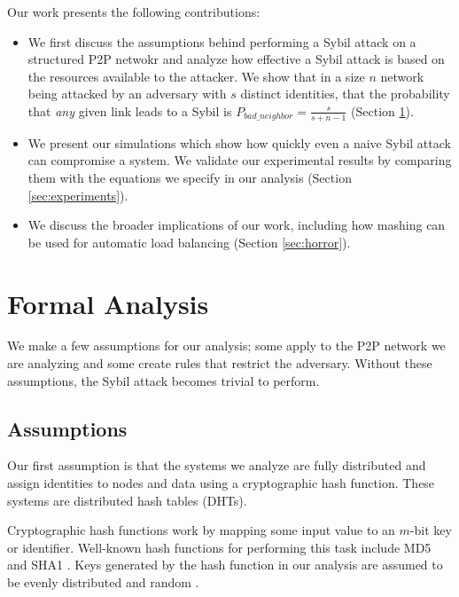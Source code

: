 \documentclass[11pt,conference]{IEEEtran}
\begin{document}
Our work presents the following contributions:
\begin{itemize}
    \item We first discuss the assumptions behind performing a Sybil attack on a structured P2P netwokr and analyze how effective a Sybil attack is based on the resources available to the attacker.
    We show that in a size $n$ network being attacked by an adversary with $s$ distinct identities,  that the probability that \textit{any} given link leads to a Sybil is $P_{bad\_neighbor} =  \frac{s}{s+ n - 1}$ (Section \ref{sec:analysis}). 
    \item We present our simulations which show how quickly even a naive Sybil attack can compromise a system. 
    We validate our experimental results by comparing them with the equations we specify in our analysis (Section \ref{sec:experiments}).
    \item We discuss the broader implications of our work, including how mashing can be used for automatic load balancing (Section \ref{sec:horror}).

\end{itemize}

\section{Formal Analysis}
\label{sec:analysis}

We make a few assumptions for our analysis; some apply  to the P2P network we are analyzing and some create rules that restrict the adversary.
Without these assumptions, the Sybil attack becomes trivial to perform.



\subsection{Assumptions}
\label{sec:assume}

Our first assumption is that the systems we analyze are fully distributed and assign identities to nodes and data using a cryptographic hash function.
These systems are distributed hash tables (DHTs).

Cryptographic hash functions work by mapping some input value to an $m$-bit key or identifier.
Well-known hash functions for performing this task include MD5 \cite{md5} and SHA1 \cite{sha1}.
Keys generated by the hash function in our analysis are assumed to be evenly distributed and random \cite{bellare2004hash}. 
\end{document}
